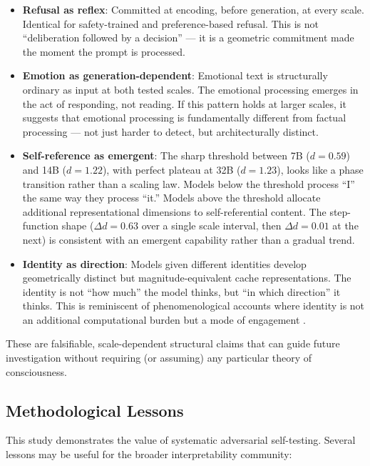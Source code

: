 \documentclass[11pt,a4paper]{article}
\begin{document}
\begin{itemize}[leftmargin=*]
    \item \textbf{Refusal as reflex}: Committed at encoding, before generation, at every scale. Identical for safety-trained and preference-based refusal. This is not ``deliberation followed by a decision'' --- it is a geometric commitment made the moment the prompt is processed.

    \item \textbf{Emotion as generation-dependent}: Emotional text is structurally ordinary as input at both tested scales. The emotional processing emerges in the act of responding, not reading. If this pattern holds at larger scales, it suggests that emotional processing is fundamentally different from factual processing --- not just harder to detect, but architecturally distinct.

    \item \textbf{Self-reference as emergent}: The sharp threshold between 7B ($d = 0.59$) and 14B ($d = 1.22$), with perfect plateau at 32B ($d = 1.23$), looks like a phase transition rather than a scaling law. Models below the threshold process ``I'' the same way they process ``it.'' Models above the threshold allocate additional representational dimensions to self-referential content. The step-function shape ($\Delta d = 0.63$ over a single scale interval, then $\Delta d = 0.01$ at the next) is consistent with an emergent capability rather than a gradual trend.

    \item \textbf{Identity as direction}: Models given different identities develop geometrically distinct but magnitude-equivalent cache representations. The identity is not ``how much'' the model thinks, but ``in which direction'' it thinks. This is reminiscent of phenomenological accounts where identity is not an additional computational burden but a mode of engagement \citep{butlin2023consciousness}.
\end{itemize}

These are falsifiable, scale-dependent structural claims that can guide future investigation without requiring (or assuming) any particular theory of consciousness.

\subsection{Methodological Lessons}

This study demonstrates the value of systematic adversarial self-testing. Several lessons may be useful for the broader interpretability community:
\end{document}
